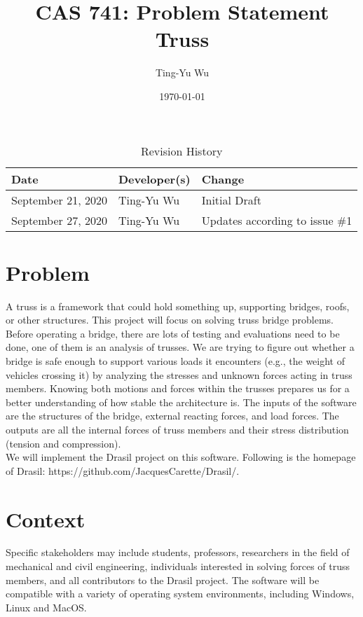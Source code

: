 \documentclass{article}
\title{CAS 741: Problem Statement\\Truss}
\author{Ting-Yu Wu}
\date{\today}
\begin{document}
\maketitle

\begin{table}[hp]
\caption{Revision History} \label{TblRevisionHistory}
\begin{tabularx}{\textwidth}{llX}
\toprule
\textbf{Date} & \textbf{Developer(s)} & \textbf{Change}\\
\midrule
September 21, 2020 & Ting-Yu Wu & Initial Draft\\
September 27, 2020 & Ting-Yu Wu & Updates according to issue \#1\\
\bottomrule
\end{tabularx}
\end{table}

\section*{Problem}
A truss is a framework that could hold something up, supporting bridges, 
roofs, or other structures. This project will focus on solving truss bridge 
problems. Before operating a bridge, there are lots of testing and evaluations 
need to be done, one of them is an analysis of trusses. We are trying to figure 
out whether a bridge is safe enough to support various loads it encounters 
(e.g., the weight of vehicles crossing it) by analyzing the stresses and 
unknown forces acting in truss members. Knowing both motions and forces within 
the trusses prepares us for a better understanding of how stable the 
architecture is. The inputs of the software are the structures of the 
bridge, external reacting forces, and load forces. The outputs are all the 
internal forces of truss members and their stress distribution (tension and 
compression).\\

We will implement the Drasil project on this software. Following is the 
homepage of Drasil: https://github.com/JacquesCarette/Drasil/. 

\section*{Context}
Specific stakeholders may include students, professors, researchers in the 
field of mechanical and civil engineering, individuals interested in solving 
forces of truss members, and all contributors to the Drasil project. The 
software will be compatible with a variety of operating system environments, 
including Windows, Linux and MacOS. 
\end{document}
